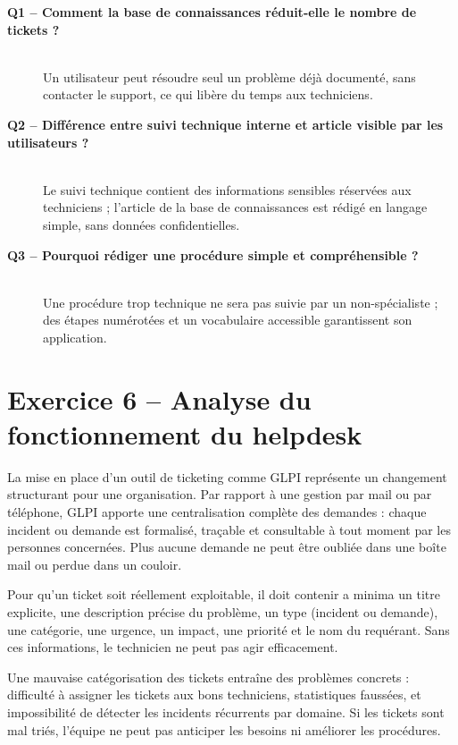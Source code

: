 \documentclass[a4paper,11pt]{article}
\begin{document}
\begin{qabox}
\begin{description}
    \item[\textbf{Q1 -- Comment la base de connaissances réduit-elle le nombre de tickets ?}]~\\
    Un utilisateur peut résoudre seul un problème déjà documenté, sans contacter le support, ce qui libère du temps aux techniciens.

    \item[\textbf{Q2 -- Différence entre suivi technique interne et article visible par les utilisateurs ?}]~\\
    Le suivi technique contient des informations sensibles réservées aux techniciens ; l'article de la base de connaissances est rédigé en langage simple, sans données confidentielles.

    \item[\textbf{Q3 -- Pourquoi rédiger une procédure simple et compréhensible ?}]~\\
    Une procédure trop technique ne sera pas suivie par un non-spécialiste ; des étapes numérotées et un vocabulaire accessible garantissent son application.
\end{description}
\end{qabox}

\newpage

\section{Exercice 6 -- Analyse du fonctionnement du helpdesk}

La mise en place d'un outil de ticketing comme GLPI représente un changement structurant pour une organisation. Par rapport à une gestion par mail ou par téléphone, GLPI apporte une centralisation complète des demandes : chaque incident ou demande est formalisé, traçable et consultable à tout moment par les personnes concernées. Plus aucune demande ne peut être oubliée dans une boîte mail ou perdue dans un couloir.

Pour qu'un ticket soit réellement exploitable, il doit contenir a minima un titre explicite, une description précise du problème, un type (incident ou demande), une catégorie, une urgence, un impact, une priorité et le nom du requérant. Sans ces informations, le technicien ne peut pas agir efficacement.

Une mauvaise catégorisation des tickets entraîne des problèmes concrets : difficulté à assigner les tickets aux bons techniciens, statistiques faussées, et impossibilité de détecter les incidents récurrents par domaine. Si les tickets sont mal triés, l'équipe ne peut pas anticiper les besoins ni améliorer les procédures.
\end{document}
